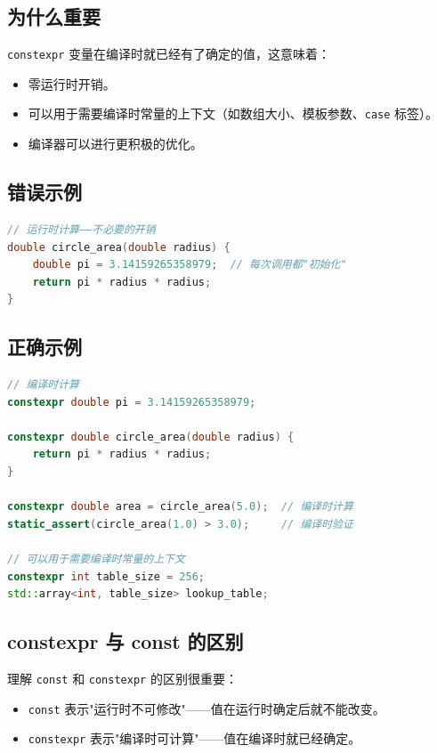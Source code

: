 \subsection{为什么重要}

\texttt{constexpr} 变量在编译时就已经有了确定的值，这意味着：
\begin{itemize}
  \item 零运行时开销。
  \item 可以用于需要编译时常量的上下文（如数组大小、模板参数、\texttt{case} 标签）。
  \item 编译器可以进行更积极的优化。
\end{itemize}

\subsection{错误示例}

\begin{lstlisting}[language=C++]
// 运行时计算——不必要的开销
double circle_area(double radius) {
    double pi = 3.14159265358979;  // 每次调用都"初始化"
    return pi * radius * radius;
}
\end{lstlisting}

\subsection{正确示例}

\begin{lstlisting}[language=C++]
// 编译时计算
constexpr double pi = 3.14159265358979;

constexpr double circle_area(double radius) {
    return pi * radius * radius;
}

constexpr double area = circle_area(5.0);  // 编译时计算
static_assert(circle_area(1.0) > 3.0);     // 编译时验证

// 可以用于需要编译时常量的上下文
constexpr int table_size = 256;
std::array<int, table_size> lookup_table;
\end{lstlisting}

\subsection{constexpr 与 const 的区别}

理解 \texttt{const} 和 \texttt{constexpr} 的区别很重要：

\begin{itemize}
  \item \texttt{const} 表示"运行时不可修改"——值在运行时确定后就不能改变。
  \item \texttt{constexpr} 表示"编译时可计算"——值在编译时就已经确定。
\end{itemize}

